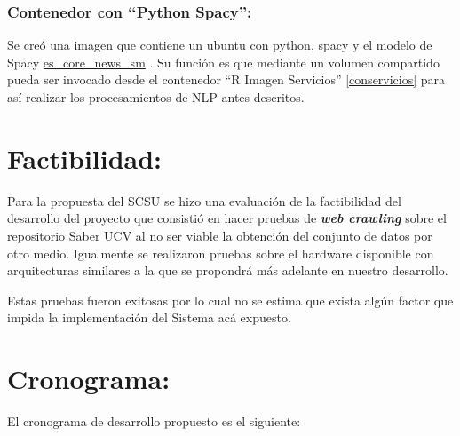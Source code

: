 \documentclass[
  10,
  openany]{book}
\begin{document}
\hypertarget{conspacy}{%
\subsubsection{Contenedor con ``Python Spacy'':}\label{conspacy}}

Se creó una imagen que contiene un ubuntu con python, spacy y el modelo de Spacy \href{https://spacy.io/models/es\#es_core_news_sm}{es\_core\_news\_sm} . Su función es que mediante un volumen compartido pueda ser invocado desde el contenedor ``R Imagen Servicios'' \ref{conservicios} para así realizar los procesamientos de NLP antes descritos.

\hypertarget{factibilidad}{%
\section{Factibilidad:}\label{factibilidad}}

Para la propuesta del SCSU se hizo una evaluación de la factibilidad del desarrollo del proyecto que consistió en hacer pruebas de \textbf{\emph{web crawling}} sobre el repositorio Saber UCV al no ser viable la obtención del conjunto de datos por otro medio. Igualmente se realizaron pruebas sobre el hardware disponible con arquitecturas similares a la que se propondrá más adelante en nuestro desarrollo.

Estas pruebas fueron exitosas por lo cual no se estima que exista algún factor que impida la implementación del Sistema acá expuesto.

\hypertarget{cronograma}{%
\section{Cronograma:}\label{cronograma}}

El cronograma de desarrollo propuesto es el siguiente:

\providecommand{\docline}[3]{\noalign{\global\setlength{\arrayrulewidth}{#1}}\arrayrulecolor[HTML]{#2}\cline{#3}}

\setlength{\tabcolsep}{2pt}

\renewcommand*{\arraystretch}{1.5}
\end{document}
